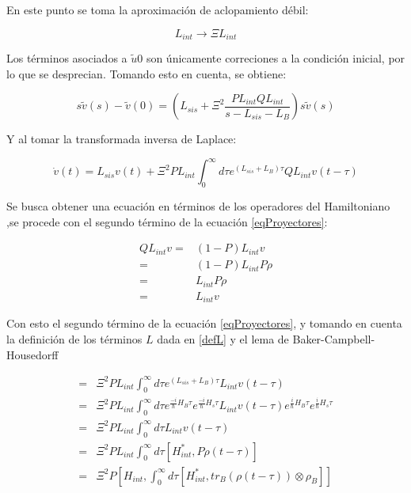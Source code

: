 \documentclass[a4paper,10pt]{report}
\begin{document}
En este punto se toma la aproximación de aclopamiento débil:

\begin{equation}
L_{int} \rightarrow \Xi L_{int}
\end{equation}

Los términos asociados a $\tilde{u}0$ son únicamente correciones a la condición inicial, por lo que se desprecian. Tomando esto en cuenta, se obtiene:

\begin{equation}
s\tilde{v}(s)-\tilde{v}(0) = (L_{sis}+\Xi^2\frac{PL_{int}QL_{int}}{s-L_{sis}-L_{B}})s\tilde{v}(s)
\end{equation}

Y al tomar la transformada inversa de Laplace:

\begin{equation}\label{eqProyectores}
\dot{v}(t)=L_{sis}v(t) + \Xi^2 PL_{int} \int_{0}^{\infty}d\tau e^{(L_{sis}+L_{B})\tau}QL_{int}v(t-\tau)
\end{equation}

Se busca obtener una ecuación en términos de los operadores del Hamiltoniano \cite{ZollerQN},se procede con el segundo término de la ecuación \eqref{eqProyectores}:

\begin{align*}
QL_{int}v=&(1-P)L_{int}v\\
=& (1-P)L_{int}P\rho \\
=& L_{int}P\rho \\
=& L_{int}v
\end{align*}

Con esto el segundo término de la ecuación \eqref{eqProyectores}, y tomando en cuenta la definición de los términos $L$ dada en \eqref{defL} y el lema de Baker-Campbell-Housedorff \cite{SakuraiQM}

\begin{align*}
=& \Xi^2 PL_{int} \int_{0}^{\infty}d\tau e^{(L_{sis}+L_{B})\tau}L_{int}v(t-\tau)\\
=& \Xi^2 PL_{int} \int_{0}^{\infty}d\tau e^{\frac{-i}{\hbar}H_B\tau}e^{\frac{-i}{\hbar}H_s\tau}L_{int}v(t-\tau)e^{\frac{i}{\hbar}H_B\tau}e^{\frac{i}{\hbar}H_s\tau}\\
=&\Xi^2 PL_{int} \int_{0}^{\infty}d\tau L_{int}v(t-\tau) \\
=&\Xi^2 PL_{int} \int_{0}^{\infty}d\tau[H_{int}^*,P\rho(t-\tau)] \\
=&\Xi^2 P[H_{int},\int_{0}^{\infty}d\tau[H_{int}^*,tr_B(\rho(t-\tau))\otimes\rho_B]]
\end{align*}
\end{document}
